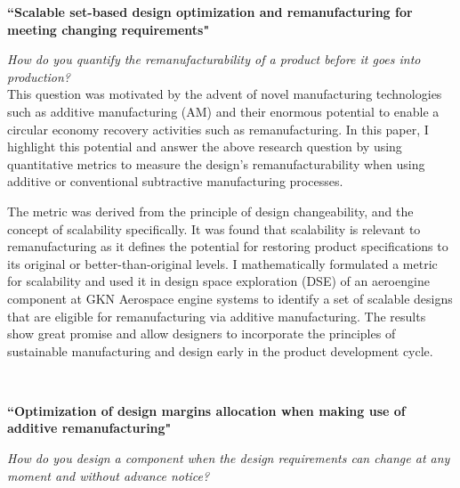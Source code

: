\documentclass[10pt]{article} %
\begin{document}
{\raggedright\textbf{``Scalable set-based design optimization and remanufacturing for meeting changing requirements"}}
\textit{\center How do you quantify the remanufacturability of a product before it goes into production?}\\

This question was motivated by the advent of novel manufacturing technologies such as additive manufacturing (AM) and their enormous potential to enable a circular economy recovery activities such as remanufacturing. In this paper, I highlight this potential and answer the above research question by using quantitative metrics to measure the design's remanufacturability when using additive or conventional subtractive manufacturing processes.

The metric was derived from the principle of design changeability, and the concept of scalability specifically. It was found that scalability is relevant to remanufacturing as it defines the potential for restoring product specifications to its original or better-than-original levels. I mathematically formulated a metric for scalability and used it in design space exploration (DSE) of an aeroengine component at GKN Aerospace engine systems to identify a set of scalable designs that are eligible for remanufacturing via additive manufacturing. The results show great promise and allow designers to incorporate the principles of sustainable manufacturing and design early in the product development cycle.

~
~
~
~
~
~
~
~
~

{\raggedright\textbf{``Optimization of design margins allocation when making use of additive remanufacturing"}}
\textit{\center How do you design a component when the design requirements can change at any moment and without advance notice?}\\
\end{document}
